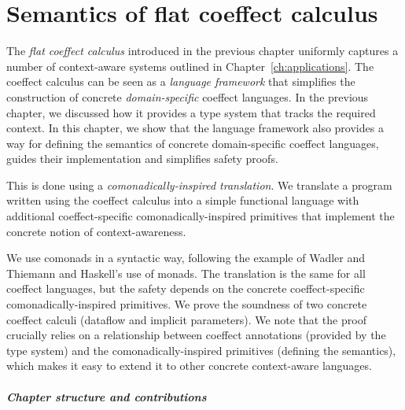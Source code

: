 
\chapter{Semantics of flat coeffect calculus}
\label{ch:semantics}

The \emph{flat coeffect calculus} introduced in the previous chapter uniformly captures a number
of context-aware systems outlined in Chapter~\ref{ch:applications}. The coeffect calculus
can be seen as a \emph{language framework} that simplifies the construction of concrete
\emph{domain-specific} coeffect languages. In the previous chapter, we discussed how it provides a
type system that tracks the required context. In this chapter, we show that the language framework
also provides a way for defining the semantics of concrete domain-specific coeffect languages,
guides their implementation and simplifies safety proofs.

This is done using a \emph{comonadically-inspired translation}. We translate a program written
using the coeffect calculus into a simple functional language with additional coeffect-specific
comonadically-inspired primitives that implement the concrete notion of context-awareness.

We use comonads in a syntactic way, following the example of Wadler and Thiemann \cite{monads-effects-marriage}
and Haskell's use of monads. The translation is the same for all coeffect languages, but the safety
depends on the concrete coeffect-specific comonadically-inspired primitives. We prove the soundness
of two concrete coeffect calculi (dataflow and implicit parameters). We note that the proof
crucially relies on a relationship between coeffect annotations (provided by the type system) and
the comonadically-inspired primitives (defining the semantics), which makes it easy to extend it to
other concrete context-aware languages.

\paragraph{Chapter structure and contributions}

